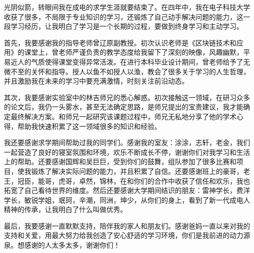 
\thesisacknowledgement
光阴似箭，转眼间我在成电的求学生涯就要结束了。在四年中，我在电子科技大学收获了很多，不局限于专业知识的学习，还锻炼了自己动手解决问题的能力，这一段学习经历，让我明白了学习是一个长期的过程，要做到终身学习和主动学习。

首先，我要感谢我的指导老师曾辽原副教授。初次认识老师是《区块链技术和应用》的课堂上，曾老师严谨负责的教学态度给我留下了深刻的映像，风趣幽默，平易近人的气质使得课堂变得异常活泼。在进行本科毕业设计期间，曾老师给予了无微不至的关怀和指导。授人以鱼不如授人以渔，教会了很多关于学习的人生哲理，并且激励我在未来的学习中要充满激情，时刻关注前沿动态。

其次，我要感谢实验室中的林吉师兄的悉心解惑。初次接触这一领域，在研习众多的论文后，我仍一头雾水，甚至无法确定思路，是师兄提出的宝贵建议，我才能确定最终解决方案。和师兄一起研究该课题过程中，师兄无私地分享了他的学术心得，帮助我快速积累了这一领域很多的知识和经验。

我还要感谢求学期间帮助过我的同学们。感谢我的室友：涂涂，志轩，老金，我们一起营造了良好的寝室氛围和环境，欢乐不断成长不停，谢谢你们对我学习和生活上的帮助。还要感谢国辉和吴巨巨，受到你们的鼓舞，组队参加了很多比赛和项目，使我锻炼了解决实际问题的能力，并且积累了自信。还要感谢班上的豪哥，老王，冠臣，能哥，虎哥，卓然，锦林，在和你们的合作中收获了信任和欢乐，我也拓宽了自己看待世界的维度。然后还要感谢大学期间结识的朋友：雷神学长，费洋学长，敏锐学姐，珉珂，辛潮，同洲，坤少，从你们的身上，看到了新一代成电人精神的传承，让我明白了什么叫做优秀。

最后，我要感谢一直默默支持，陪伴我的家人和朋友们。感谢爸妈一直以来对我的支持和关爱，用最大努力给我创造了安心舒适的学习环境，你们是我前进的动力源泉。想感谢的人太多太多，谢谢你们！
